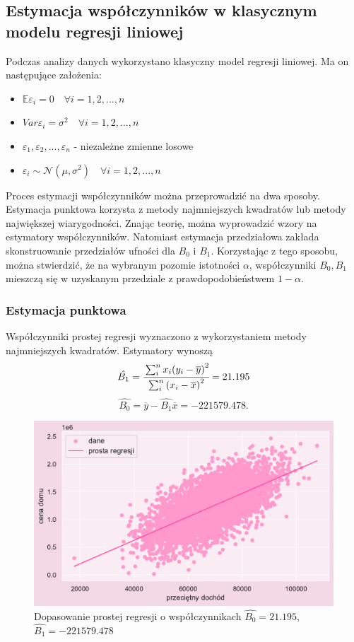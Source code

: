 \documentclass{article}
\begin{document}
\subsection{Estymacja współczynników w klasycznym modelu regresji liniowej}
Podczas analizy danych wykorzystano klasyczny model regresji liniowej. Ma on następujące założenia:
\begin{itemize}
    \item ${\mathbb{E}} \varepsilon_i = 0 \quad \forall i = 1,2,...,n$
    \item $Var \varepsilon_i = \sigma^2 \quad \forall i = 1,2,...,n$
    \item $\varepsilon_1, \varepsilon_2,...,\varepsilon_n$ - niezależne zmienne losowe
    \item $\varepsilon_i \sim \mathcal{N} (\mu,\sigma^2) \quad \forall i = 1,2,...,n $
\end{itemize} 
Proces estymacji współczynników można przeprowadzić na dwa sposoby. Estymacja punktowa korzysta z metody najmniejszych kwadratów lub metody największej wiarygodności. Znając teorię, można wyprowadzić wzory na estymatory współczynników. Natomiast estymacja przedziałowa zakłada skonstruowanie przedziałów ufności dla $B_0$ i $B_1$. Korzystając z tego sposobu, można stwierdzić, że na wybranym pozomie istotności $\alpha$, współczynniki $B_0,B_1$ mieszczą się w uzyskanym przedziale z prawdopodobieństwem $1-\alpha$.

\subsubsection{Estymacja punktowa}
\noindent Współczynniki prostej regresji wyznaczono z wykorzystaniem metody najmniejszych kwadratów. Estymatory wynoszą 
$$\hat{B_1} = \cfrac{\sum_i^n x_i {\left( y_i - \overline{y} \right) }^2}{\sum_i^n {\left( x_i - \overline{x} \right)}^2 } = 21.195$$
$$\hat{B_0} = \overline{y} - \hat{B_1} \overline{x} = -221579.478.$$

    \begin{figure}[H]
	\begin{center}
		\includegraphics[scale=0.68]{images/regresja.pdf}
		\caption{Dopasowanie prostej regresji o współczynnikach $\hat{B_0} = 21.195$, $\hat{B_1} = -221579.478$}
		\label{denistyx}
	\end{center}
	\end{figure}
\end{document}
